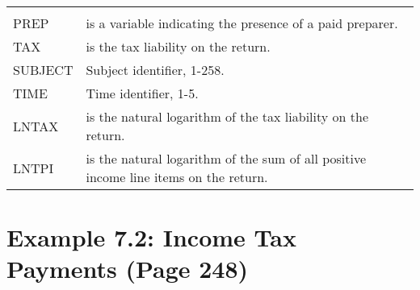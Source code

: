 \documentclass[]{book}
\begin{document}
\begin{longtable}[]{@{}ll@{}}
\begin{minipage}[t]{0.40\columnwidth}
\end{minipage}\tabularnewline
\begin{minipage}[t]{0.54\columnwidth}\raggedright
PREP\strut
\end{minipage} & \begin{minipage}[t]{0.40\columnwidth}\raggedright
is a variable indicating the presence of a paid preparer.\strut
\end{minipage}\tabularnewline
\begin{minipage}[t]{0.54\columnwidth}\raggedright
TAX\strut
\end{minipage} & \begin{minipage}[t]{0.40\columnwidth}\raggedright
is the tax liability on the return.\strut
\end{minipage}\tabularnewline
\begin{minipage}[t]{0.54\columnwidth}\raggedright
SUBJECT\strut
\end{minipage} & \begin{minipage}[t]{0.40\columnwidth}\raggedright
Subject identifier, 1-258.\strut
\end{minipage}\tabularnewline
\begin{minipage}[t]{0.54\columnwidth}\raggedright
TIME\strut
\end{minipage} & \begin{minipage}[t]{0.40\columnwidth}\raggedright
Time identifier, 1-5.\strut
\end{minipage}\tabularnewline
\begin{minipage}[t]{0.54\columnwidth}\raggedright
LNTAX\strut
\end{minipage} & \begin{minipage}[t]{0.40\columnwidth}\raggedright
is the natural logarithm of the tax liability on the return.\strut
\end{minipage}\tabularnewline
\begin{minipage}[t]{0.54\columnwidth}\raggedright
LNTPI\strut
\end{minipage} & \begin{minipage}[t]{0.40\columnwidth}\raggedright
is the natural logarithm of the sum of all positive income line items on the return.\strut
\end{minipage}\tabularnewline
\bottomrule
\end{longtable}

\hypertarget{example-7.2-income-tax-payments-page-248}{%
\section{Example 7.2: Income Tax Payments (Page 248)}\label{example-7.2-income-tax-payments-page-248}}
\end{document}

